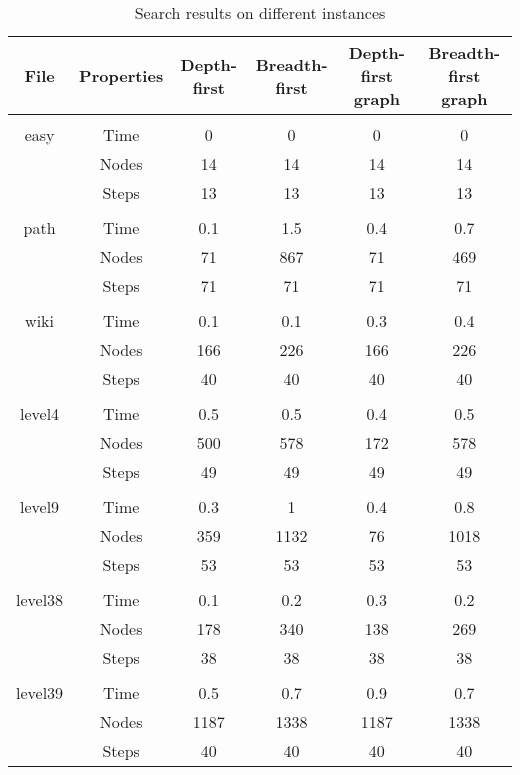\documentclass[10pt,a4paper]{article}
\begin{document}
\begin{enumerate}
\begin{table}
	\caption{\label{benchmark} Search results on different instances}
	\begin{tabular}{|c|c|c|c|c|c|}
	\hline 
	File & Properties & Depth-first & Breadth-first & Depth-first graph & Breadth-first graph \\ 
	\hline 
	 &  &  &  &  & \\ 
	\hline 
	easy & Time & 0 & 0 & 0 & 0 \\ 
	\hline 
	 & Nodes & 14 & 14 & 14 & 14 \\ 
	\hline 
	 & Steps & 13 & 13 & 13 & 13 \\ 
	 \hline 
	 &  &  &  &  & \\ 
	\hline 
	path & Time & 0.1 & 1.5 & 0.4 & 0.7 \\ 
	\hline 
	 & Nodes & 71 & 867 & 71 & 469 \\ 
	\hline 
	 & Steps & 71 & 71 & 71 & 71 \\ 
	 \hline 
	 &  &  &  &  & \\ 
	\hline 
	wiki & Time & 0.1 & 0.1 & 0.3 & 0.4 \\ 
	\hline 
	 & Nodes & 166 & 226 & 166 & 226 \\ 
	\hline 
	 & Steps & 40 & 40 & 40 & 40 \\ 
	 \hline 
	 &  &  &  &  & \\ 
	\hline 
	level4 & Time & 0.5 & 0.5 & 0.4 & 0.5 \\ 
	\hline 
	 & Nodes & 500 & 578 & 172 & 578 \\ 
	\hline 
	 & Steps & 49 & 49 & 49 & 49 \\ 
	\hline 
	 &  &  &  &  & \\ 
	\hline 
	level9 & Time & 0.3 & 1 & 0.4 & 0.8 \\ 
	\hline 
	 & Nodes & 359 & 1132 & 76 & 1018 \\ 
	\hline 
	 & Steps & 53 & 53 & 53 & 53 \\ 
	  \hline 
	 &  &  &  &  & \\ 
	\hline 
	level38 & Time & 0.1 & 0.2 & 0.3 & 0.2 \\ 
	\hline 
	 & Nodes & 178 & 340 & 138 & 269 \\ 
	\hline 
	 & Steps & 38 & 38 & 38 & 38 \\ 
	  \hline 
	 &  &  &  &  & \\ 
	\hline 
	level39 & Time & 0.5 & 0.7 & 0.9 & 0.7 \\ 
	\hline 
	 & Nodes & 1187 & 1338 & 1187 & 1338 \\ 
	\hline 
	 & Steps & 40 & 40 & 40 & 40 \\ 

\end{tabular}
\end{table}
\end{enumerate}
\end{document}
